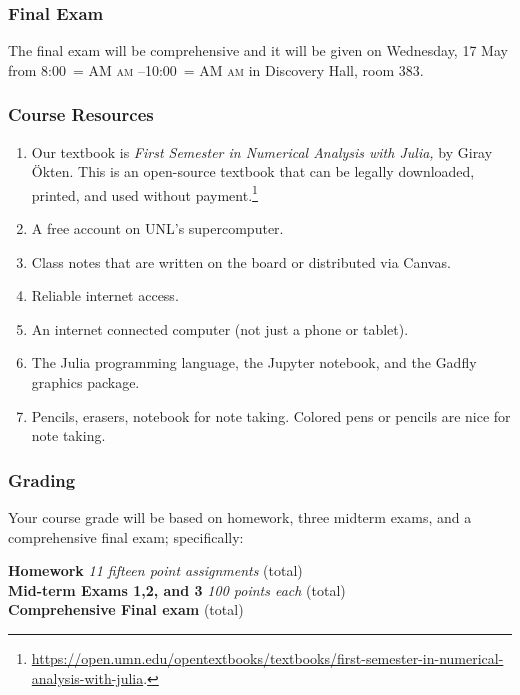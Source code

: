 \documentclass[12pt,fullpage]{article}
\makeatletter
\newcounter{ex}\setcounter{ex}{0}
\newenvironment{mypar}[2]
  {\begin{list}{}%
    {\setlength\leftmargin{#1}
    \setlength\rightmargin{#2}}
    \item[]}
  {\end{list}}
\DeclareRobustCommand{\maybefakesc}[1]{%
  \ifnum\pdfstrcmp{\f@series}{\bfdefault}=\z@
    {\fontsize{\dimexpr0.8\dimexpr\f@size pt\relax}{0}\selectfont\uppercase{#1}}%
  \else
    \textsc{#1}%
  \fi
}
\newcommand\AM{\,\maybefakesc{am}\xspace}
\newcommand\PM{\,\maybefakesc{pm}\xspace}
\newcommand{\ay}{2023}
\newcommand{\room}{Discovery Hall, room  383}
\newcommand{\ay}{2023}
\newcommand{\finalexam}{The final exam will be comprehensive and it 
will be given on Wednesday, 17 May from 8:00\AM{}--10:00\AM}
\newcommand{\finalexam}{The final exam will be comprehensive and it 
will be given on Wednesday 17 May \ay from 8:00\AM{}--10:00\PM}
\makeatother
\begin{document}
\subsubsection*{Final Exam}

\finalexam{} in \room.

\subsubsection*{Course Resources}

\begin{enumerate}

\item Our textbook is \emph{First Semester in Numerical Analysis with Julia,} by Giray Ökten.  This is an open-source 
textbook that can be legally downloaded, printed, and  used without 
payment.\footnote{ \url{https://open.umn.edu/opentextbooks/textbooks/first-semester-in-numerical-analysis-with-julia}.  \normalsize} 

\item A free account on UNL's supercomputer.

\item Class notes that are written on the board or distributed via Canvas.

\item Reliable internet access.

\item  An internet connected computer (not just a phone or tablet). 

\item The Julia programming language, the Jupyter notebook, and the Gadfly
      graphics package.

\item Pencils, erasers, notebook for note taking. Colored pens or pencils are nice 
for note taking.


 \end{enumerate}


\subsubsection*{Grading}
 Your course grade will be based on homework, three midterm exams, and a 
 comprehensive final exam; specifically:
 \begin{mypar}{0.25in}{0.25in}
       \textbf{Homework}  \emph{11 fifteen point assignments}   (total) \\
       \textbf{Mid-term Exams 1,2, and 3} \emph{100 points each}  (total)\\
          \textbf{Comprehensive Final exam}  (total)
 \end{mypar}
\end{document}

